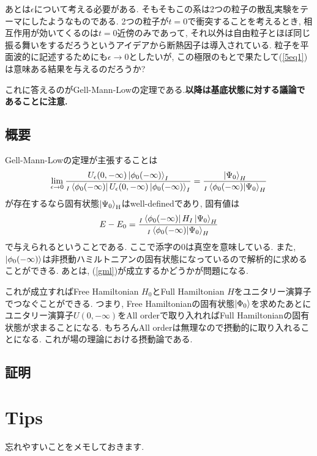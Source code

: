 \documentclass[10.5pt,a4paper]{jreport}
\begin{document}
あとは$\epsilon$について考える必要がある. そもそもこの系は2つの粒子の散乱実験をテーマにしたようなものである. 2つの粒子が$t = 0$で衝突することを考えるとき, 相互作用が効いてくるのは$t = 0$近傍のみであって, それ以外は自由粒子とほぼ同じ振る舞いをするだろうというアイデアから断熱因子は導入されている. 粒子を平面波的に記述するためにも$\epsilon\rightarrow 0$としたいが, この極限のもとで果たして(\ref{5eq1})は意味ある結果を与えるのだろうか?

これに答えるのがGell-Mann-Lowの定理である.\textbf{以降は基底状態に対する議論であることに注意.}
\subsection{概要}
Gell-Mann-Lowの定理が主張することは
\begin{eqnarray}
  \lim_{\epsilon\rightarrow0}\frac{U_\epsilon(0, -\infty)\ket{\phi_0(-\infty)}_I}{_I\bra{\phi_0(-\infty)}U_\epsilon(0, -\infty)\ket{\phi_0(-\infty)}_I} = \frac{\ket{\Psi_0}_H}{_I\expval{\phi_0(-\infty)|\Psi_0}_H}\label{gml}
\end{eqnarray}
が存在するなら固有状態$\ket{\Psi_0}_{\rm H}$はwell-definedであり, 固有値は
\begin{eqnarray}
  E-E_0 = \frac{_I\bra{\phi_0(-\infty)}H_I\ket{\Psi_0}_H}{_I\expval{\phi_0(-\infty)|\Psi_0}_H}
\end{eqnarray}
で与えられるということである. ここで添字の0は真空を意味している. また, $\ket{\phi_0(-\infty)}$は非摂動ハミルトニアンの固有状態になっているので解析的に求めることができる. あとは, (\ref{gml})が成立するかどうかが問題になる.

これが成立すればFree Hamiltonian $H_0$とFull Hamiltonian $H$をユニタリー演算子でつなぐことができる. つまり, Free Hamiltonianの固有状態$\ket{\Phi_0}$を求めたあとにユニタリー演算子$U(0, -\infty)$をAll orderで取り入れればFull Hamiltonianの固有状態が求まることになる. もちろんAll orderは無理なので摂動的に取り入れることになる. これが場の理論における摂動論である. 
\subsection{証明}

\section{Tips}
忘れやすいことをメモしておきます.
\end{document}
